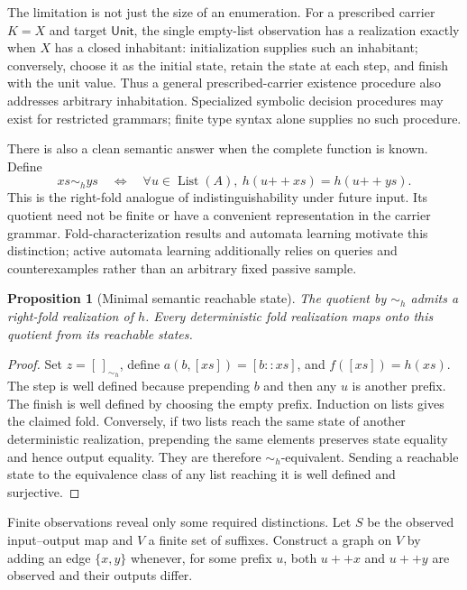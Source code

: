 \documentclass[11pt,a4paper]{article}
\newcommand{\List}{\operatorname{List}}
\newtheorem{proposition}{Proposition}[section]
\theoremstyle{remark}
\begin{document}
The limitation is not just the size of an enumeration. For a prescribed carrier $K=X$ and target $\mathsf{Unit}$, the single empty-list observation has a realization exactly when $X$ has a closed inhabitant: initialization supplies such an inhabitant; conversely, choose it as the initial state, retain the state at each step, and finish with the unit value. Thus a general prescribed-carrier existence procedure also addresses arbitrary inhabitation. Specialized symbolic decision procedures may exist for restricted grammars; finite type syntax alone supplies no such procedure.

There is also a clean semantic answer when the complete function is known. Define
\[
 xs\sim_h ys \quad\Longleftrightarrow\quad
 \forall u\in\List(A),\ h(u\mathbin{++}xs)=h(u\mathbin{++}ys).
\]
This is the right-fold analogue of indistinguishability under future input. Its quotient need not be finite or have a convenient representation in the carrier grammar. Fold-characterization results and automata learning motivate this distinction; active automata learning additionally relies on queries and counterexamples rather than an arbitrary fixed passive sample.~\cite{fold,angluin}

\begin{proposition}[Minimal semantic reachable state]
The quotient by $\sim_h$ admits a right-fold realization of $h$. Every deterministic fold realization maps onto this quotient from its reachable states.
\end{proposition}
\begin{proof}
Set $z=[\,]_{\sim_h}$, define $a(b,[xs])=[b::xs]$, and $f([xs])=h(xs)$. The step is well defined because prepending $b$ and then any $u$ is another prefix. The finish is well defined by choosing the empty prefix. Induction on lists gives the claimed fold. Conversely, if two lists reach the same state of another deterministic realization, prepending the same elements preserves state equality and hence output equality. They are therefore $\sim_h$-equivalent. Sending a reachable state to the equivalence class of any list reaching it is well defined and surjective.
\end{proof}

Finite observations reveal only some required distinctions. Let $S$ be the observed input--output map and $V$ a finite set of suffixes. Construct a graph on $V$ by adding an edge $\{x,y\}$ whenever, for some prefix $u$, both $u++x$ and $u++y$ are observed and their outputs differ.
\end{document}
